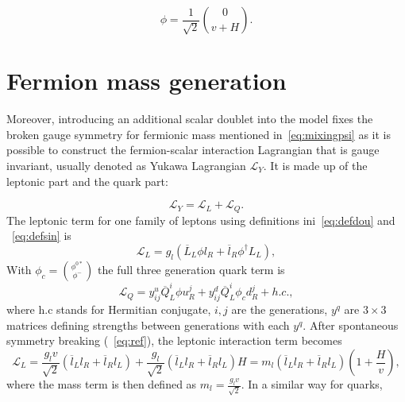 \begin{equation}
\phi=\frac{1}{\sqrt{2}}\binom{0}{v+H}.
\label{eq:ref}
\end{equation}


\section{Fermion mass generation}
\label{mass}
Moreover, introducing an additional scalar doublet into the model fixes the broken gauge symmetry for fermionic mass mentioned in~\autoref{eq:mixingpsi} as it is possible to construct the fermion-scalar interaction Lagrangian that is gauge invariant, usually denoted as Yukawa Lagrangian $\mathcal{L}_{Y}$. It is made up of the leptonic part and the quark part:

\begin{equation}
	\mathcal{L}_{Y}= \mathcal{L}_{L} + \mathcal{L}_{Q}.
\end{equation}
The leptonic term for one family of leptons using definitions ini~\autoref{eq:defdou} and ~\autoref{eq:defsin} is
\begin{equation}
	\mathcal{L}_{L}= g_{l}(\overline{L}_{L}\phi l_{R} + \overline{l}_{R} \phi^{\dagger} L_{L}), 
	\label{eq:SSB1}
\end{equation}
With $\phi_{c}=\binom{\phi^{0*}}{\phi^{-}}$ the full three generation quark term is
\begin{equation}
	\mathcal{L}_{Q}= y^{u}_{ij}\overline{Q}^{i}_{L}\phi u^{j}_{R} + {y}^{d}_{ij}\overline{Q}^{i}_{L}\phi_{c} d^{j}_{R} + h.c .,
	\label{eq:SSB2}
\end{equation}
where h.c stands for Hermitian conjugate, $i,j$ are the generations, $y^{q}$ are $3\times3$ matrices defining strengths between generations with each $y^{q}$. After spontaneous symmetry breaking (~\autoref{eq:ref}), the leptonic interaction term becomes
\begin{equation}
	\mathcal{L}_{L}= \frac{g_{l}v}{\sqrt{2}}(\overline{l}_{L}l_{R} + \overline{l}_{R}l_{L}) + \frac{g_{l}}{\sqrt{2}}(\overline{l}_{L} l_{R}+\overline{l}_{R} l_{L})H = m_{l}(\overline{l}_{L}l_{R} + \overline{l}_{R}l_{L})(1+\frac{H}{v}),
        \label{eq:SSB3}
\end{equation}
where the mass term is then defined as $m_{l}=\frac{g_{l}v}{\sqrt{2}}$. In a similar way for quarks,



